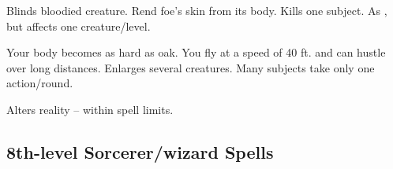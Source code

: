 \begin{swspelllist}
   Blinds bloodied creature.
   Rend foe's skin from its body.
   Kills one subject.
   As , but affects one creature/level.

   Your body becomes as hard as oak.
   You fly at a speed of 40 ft. and can hustle over long distances.
   Enlarges several creatures.
   Many subjects take only one action/round.

  \M Alters reality -- within spell limits.
\end{swspelllist}

\subsection{8th-level Sorcerer/wizard Spells} 
